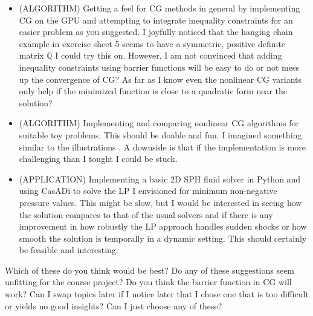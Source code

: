 \documentclass[oneside, a4paper]{book}
\newcommand\mat[1]{{\mathds{#1}}}
\begin{document}
\begin{itemize}
    \item (ALGORITHM) Getting a feel for CG methods in general by implementing CG on the GPU and attempting to integrate inequality constraints for an easier problem as you suggested. I joyfully noticed that the hanging chain example in exercise sheet 5 seems to have a symmetric, positive definite matrix $\mat{Q}$ I could try this on. However, I am not convinced that adding inequality constraints using barrier functions will be easy to do or not mess up the convergence of CG? As far as I know even the nonlinear CG variants only help if the minimized function is close to a quadratic form near the solution?
    \item (ALGORITHM) Implementing and comparing nonlinear CG algorithms for suitable toy problems. This should be doable and fun. I imagined something similar to the illustrations \autocite[on page 44 of this report]{agonizing-cg}. A downside is that if the implementation is more challenging than I tought I could be stuck.
    \item (APPLICATION) Implementing a basic 2D SPH fluid solver in Python and using CasADi to solve the LP I envisioned for minimum non-negative pressure values. This might be slow, but I would be interested in seeing how the solution compares to that of the usual solvers and if there is any improvement in how robustly the LP approach handles sudden shocks or how smooth the solution is temporally in a dynamic setting. This should certainly be feasible and interesting.
\end{itemize}

Which of these do you think would be best? Do any of these suggestions seem unfitting for the course project? Do you think the barrier function in CG will work? Can I swap topics later if I notice later that I chose one that is too difficult or yields no good insights? Can I just choose any of these?

\printbibliography[
  heading=bibintoc,
  title={Bibliography}
]
\end{document}
